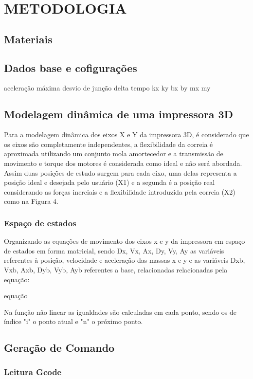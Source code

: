 \chapter{METODOLOGIA}

\section{Materiais}

\section{Dados base e cofigurações}

aceleração máxima
desvio de junção
delta tempo
kx
ky
bx
by
mx
my


\section{Modelagem dinâmica de uma impressora 3D}
Para a modelagem dinâmica dos eixos X e Y da impressora 3D, 
é considerado que os eixos são completamente independentes, 
a flexibilidade da correia é aproximada utilizando um conjunto 
mola amortecedor e a transmissão de movimento e torque dos 
motores é considerada como ideal e não será abordada.
Assim duas posições de estudo surgem para cada eixo, uma delas 
representa a posição ideal e desejada pelo usuário (X1) e a 
segunda é a posição real considerando as forças inerciais e a 
flexibilidade introduzida pela correia (X2) como na Figura 4.

\subsection{Espaço de estados}
Organizando as equações de movimento dos eixos x e y da 
impressora em espaço de estados em forma matricial, sendo 
Dx, Vx, Ax, Dy, Vy, Ay as variáveis referentes à posição,
velocidade e aceleração das massas x e y e as variáveis Dxb, 
Vxb, Axb, Dyb, Vyb, Ayb referentes a base, relacionadas 
relacionadas pela equação:

equação

Na função não linear as igualdades são calculadas em cada ponto, 
sendo os de índice "i" o ponto atual e "n" o próximo ponto.

\section{Geração de Comando}

\subsection{Leitura Gcode}

